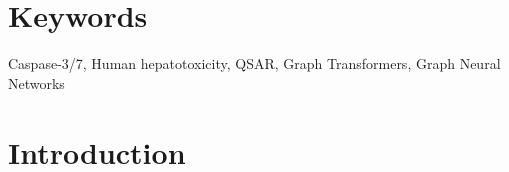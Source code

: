 \documentclass[letterpaper]{article}
\begin{document}
\clearpage


\begin{abstract}
Caspase-3 and -7 are key effector caspases in the apoptotic pathway, a form of programmed cell death, and their activities serve as a well-established biomarker for evaluating environmental chemical toxicity and informing chemical risk assessment. Loss of mitochondrial membrane potential is a key event in the activation of Caspase-3/7 signaling and the subsequent induction of apoptosis. Therefore, simultaneous assessment of mitochondrial membrane potential and Caspase-3/7 activity enables elucidation of the mechanisms and pathways through which apoptosis is initiated. Quantitative Structure–Activity Relationship (QSAR) modeling have been widely used for toxicity prediction. While advanced graph deep learning approaches, such as graph transformers (GTs), have shown outstanding performance in many domains, they have not been fully leveraged in QSAR modeling.
%
\end{abstract}

\section*{Keywords}

Caspase-3/7, Human hepatotoxicity, QSAR, Graph Transformers, Graph Neural Networks



\section{Introduction}

\end{document}
